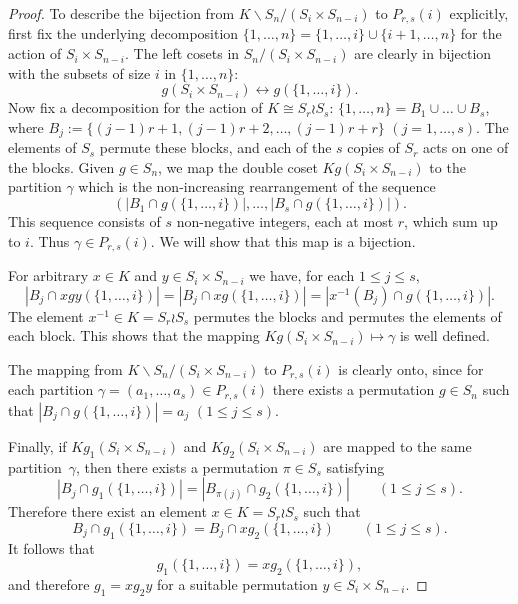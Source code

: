 \documentclass[ALCO,published]{cedram}
\newcommand{\card}[1]{\ensuremath{\left|#1\right|}}
\begin{document}
\begin{proof}
    To describe the bijection from $K\backslash S_n/(S_i \times S_{n-i})$ to $P_{r,s}(i)$ explicitly,
    first fix the underlying decomposition $\{1, \ldots, n\} = \{1,\ldots,i\} \cup \{i+1,\ldots, n\}$ for the action of $S_i\times S_{n-i}$. 
    The left cosets in $S_n/(S_i \times S_{n-i})$ are clearly in bijection with the subsets of size $i$ in $\{1, \ldots, n\}$:
    \[
        g(S_i \times S_{n-i}) \longleftrightarrow g(\{1, \ldots, i\}).
    \]
    Now fix a decomposition for the action of $K \cong S_r \wr S_s$: 
    $\{1, \ldots, n\} = B_1 \cup \ldots \cup B_s$,
    where $B_j := \{(j-1)r+1,(j-1)r+2,\ldots,(j-1)r+r\}$ $(j = 1,\ldots,s)$. 
    The elements of $S_s$ permute these blocks,
    and each of the $s$ copies of $S_r$ acts on one of the blocks.
    Given $g \in S_n$, we map the double coset $K g (S_i \times S_{n-i})$ to the partition $\gamma$ which is the non-increasing rearrangement of the sequence
    \[
        (\card{B_1 \cap g(\{1,\ldots,i\})}, \ldots, \card{B_s \cap g(\{1,\ldots,i\})}).
    \]
    This sequence consists of $s$ non-negative integers, each at most $r$, which sum up to $i$. Thus $\gamma \in P_{r,s}(i)$.
    We will show that this map is a bijection.

    For arbitrary $x\in K$ and $y\in S_i\times S_{n-i}$ we have,
    for each $1 \le j \le s$,
    \[
        \card{B_j \cap xgy(\{1,\ldots,i\})} 
        = \card{B_j \cap xg(\{1,\ldots,i\})}
        = \card{x^{-1}(B_j) \cap g(\{1,\ldots,i\})}.
    \]
    The element $x^{-1} \in K = S_r \wr S_s$ permutes the blocks and permutes the elements of each block. This shows that the mapping $Kg(S_i \times S_{n-i}) \mapsto \gamma$ is well defined.

    The mapping from $K\backslash S_n/(S_i \times S_{n-i})$ to $P_{r,s}(i)$ is clearly onto, since
    for each partition $\gamma = (a_1,\ldots,a_s) \in P_{r,s}(i)$ there exists a permutation $g \in S_n$ such that  $\card{B_j \cap g(\{1,\ldots,i\})} = a_j$ $(1 \le j \le s)$. 
		
    Finally, if $K g_1 (S_i \times S_{n-i})$ and $K g_2 (S_i \times S_{n-i})$ are mapped to the same partition~$\gamma$, then there exists a permutation $\pi \in S_s$ satisfying
    \[
        \card{B_j \cap g_1(\{1,\ldots,i\})}
        = \card{B_{\pi(j)} \cap g_2(\{1,\ldots,i\})}
        \qquad (1 \le j \le s).
    \]
    Therefore there exist an element $x \in K = S_r \wr S_s$ such that
    \[
        B_j \cap g_1(\{1,\ldots,i\})
        = B_j \cap xg_2(\{1,\ldots,i\})
        \qquad (1 \le j \le s).
    \]
    It follows that
    \[
        g_1(\{1,\ldots,i\}) = xg_2(\{1,\ldots,i\}),
    \]
    and therefore $g_1 = xg_2y$ for a suitable permutation $y \in S_i \times S_{n-i}$.
\end{proof}
\end{document}
